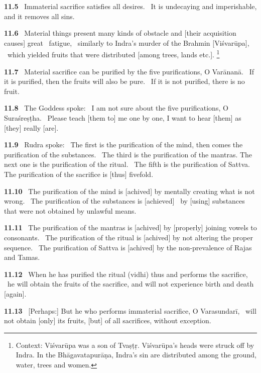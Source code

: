 \documentclass{article}
\begin{document}
\textbf{11.5}%
\ Immaterial sacrifice satisfies all desires.%
\ It is undecaying and imperishable, and it removes all sins.%


\textbf{11.6}%
\ Material things present many kinds of obstacle and [their acquisition causes] great%
\                      fatigue,%
\ similarly to Indra's murder of the Brahmin [Viśvarūpa],%
\              which yielded fruits that were distributed [among trees, lands etc.].%
\footnote{Context: Viśvarūpa was a son of Tvaṣṭṛ. Viśvarūpa's heads were struck off by Indra.                          In the Bhāgavatapurāṇa, Indra's sin are distributed among the ground,                          water, trees and women. }%


\textbf{11.7}%
\ Material sacrifice can be purified by the five purifications, O Varānanā.%
\ If it is purified, then the fruits will also be pure.%
\              If it is not purified, there is no fruit.%


\textbf{11.8}%
\ The Goddess spoke:%
\ I am not sure about the five purifications, O Suraśreṣṭha.%
\ Please teach [them to] me one by one, I want to hear [them] as [they] really [are].%


\textbf{11.9}%
\ Rudra spoke:%
\ The first is the purification of the mind, then comes the purification of the substances.%
\ The third is the purification of the mantras. The next one is the purification of the ritual.%
\ The fifth is the purification of Sattva. The purification of the sacrifice is [thus] fivefold.%


\textbf{11.10}%
\ The purification of the mind is [achived] by mentally creating what is not wrong.%
\ The purification of the substances is [achieved]%
\                         by [using] substances that were not obtained by unlawful means.%


\textbf{11.11}%
\ The purification of the mantras is [achived] by [properly] joining vowels to consonants.%
\ The purification of the ritual is [achived] by not altering the proper sequence.%
\ The purification of Sattva is [achived] by the non-prevalence of Rajas and Tamas.%


\textbf{11.12}%
\ When he has purified the ritual (vidhi) thus and performs the sacrifice,%
\ he will obtain the fruits of the sacrifice, and will not experience birth and death [again].%


\textbf{11.13}%
\ [Perhaps:] But he who performs immaterial sacrifice, O Varasundarī,%
\ will not obtain [only] its fruits, [but] of all sacrifices, without exception.%
\end{document}
